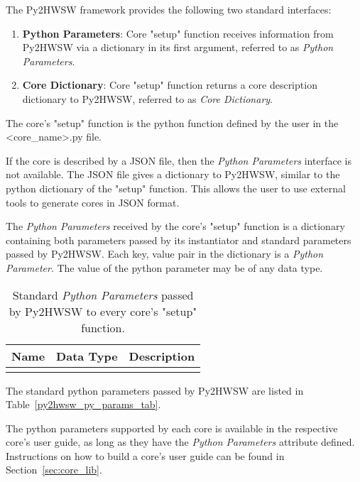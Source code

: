 %

The Py2HWSW framework provides the following two standard interfaces:
\begin{enumerate}
  \item \textbf{Python Parameters}: Core "setup" function receives information from Py2HWSW via a dictionary in its first argument, referred to as \textit{Python Parameters}.
  \item \textbf{Core Dictionary}: Core "setup" function returns a core description dictionary to Py2HWSW, referred to as \textit{Core Dictionary}.
\end{enumerate}

The core's "setup" function is the python function defined by the user in the <core\_name>.py file.

If the core is described by a JSON file, then the \textit{Python Parameters} interface is not available.
The JSON file gives a dictionary to Py2HWSW, similar to the python dictionary of the "setup" function.
This allows the user to use external tools to generate cores in JSON format.

%
%

The \textit{Python Parameters} received by the core's "setup" function is a dictionary containing both parameters passed by its instantiator and standard parameters passed by Py2HWSW.
Each key, value pair in the dictionary is a \textit{Python Parameter}.
The value of the python parameter may be of any data type.

\begin{xltabular}{\textwidth}{|l|l|X|}

  \hline
  {\bf Name} & {\bf Data Type} & {\bf Description}  \\ \hline \hline

  

  \caption{Standard \textit{Python Parameters} passed by Py2HWSW to every core's "setup" function.}
\end{xltabular}
\label{py2hwsw_py_params_tab}

The standard python parameters passed by Py2HWSW are listed in Table~\ref{py2hwsw_py_params_tab}.

The python parameters supported by each core is available in the respective core's user guide, as long as they have the \textit{Python Parameters} attribute defined.
Instructions on how to build a core's user guide can be found in Section~\ref{sec:core_lib}. 


